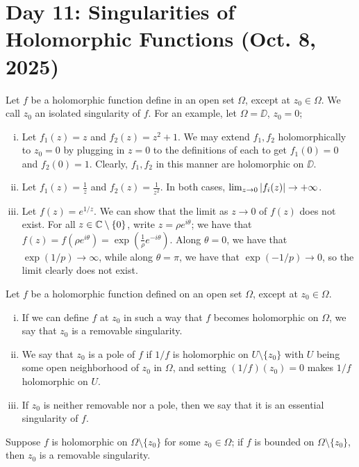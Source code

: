 \section{Day 11: Singularities of Holomorphic Functions (Oct. 8, 2025)}
Let $f$ be a holomorphic function define in an open set $\Omega$, except at $z_0 \in \Omega$. We call $z_0$ an isolated singularity of $f$. For an example, let $\Omega = \DD$, $z_0 = 0$;
\begin{enumerate}[(i)]
    \item Let $f_1(z) = z$ and $f_2(z) = z^2 + 1$. We may extend $f_1, f_2$ holomorphically to $z_0 = 0$ by plugging in $z = 0$ to the definitions of each to get $f_1(0) = 0$ and $f_2(0) = 1$. Clearly, $f_1, f_2$ in this manner are holomorphic on $\DD$.
    \item Let $f_1(z) = \frac{1}{z}$ and $f_2(z) = \frac{1}{z^2}$. In both cases, $\lim_{z \to 0} \left\lvert f_i(z) \right\rvert \to +\infty$.
    \item Let $f(z) = e^{1/z}$. We can show that the limit as $z \to 0$ of $f(z)$ does not exist. For all $z \in \mathbb C \setminus \{0\}$, write $z = \rho e^{i\theta}$; we have that $f(z) = f(\rho e^{i\theta}) = \exp(\frac{1}{\rho}e^{-i\theta})$. Along $\theta = 0$, we have that $\exp(1/p) \to \infty$, while along $\theta = \pi$, we have that $\exp(-1/p) \to 0$, so the limit clearly does not exist.
\end{enumerate}
\noindent Let $f$ be a holomorphic function defined on an open set $\Omega$, except at $z_0 \in \Omega$.
\begin{enumerate}[(i)]
    \item If we can define $f$ at $z_0$ in such a way that $f$ becomes holomorphic on $\Omega$, we say that $z_0$ is a removable singularity.
    \item We say that $z_0$ is a pole of $f$ if $1/f$ is holomorphic on $U \setminus \{z_0\}$ with $U$ being some open neighborhood of $z_0$ in $\Omega$, and setting $(1/f)(z_0) = 0$ makes $1/f$ holomorphic on $U$.
    \item If $z_0$ is neither removable nor a pole, then we say that it is an essential singularity of $f$.
\end{enumerate}
\begin{theorem}
    Suppose $f$ is holomorphic on $\Omega \setminus \{z_0\}$ for some $z_0 \in \Omega$; if $f$ is bounded on $\Omega \setminus \{z_0\}$, then $z_0$ is a removable singularity.
\end{theorem}
